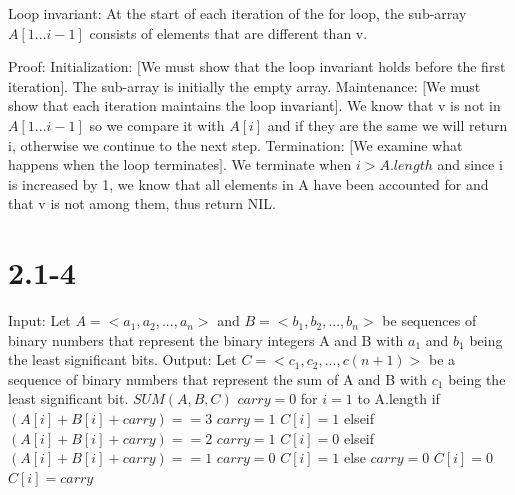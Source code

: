 \documentclass[12pt]{article}
\newcommand\tab[1][1cm]{\hspace*{#1}}
\begin{document}
Loop invariant: At the start of each iteration of the for loop, the sub-array $A[1...i-1]$ consists of elements that are different than v. \newline

Proof: \newline 
Initialization: $[$We must show that the loop invariant holds before the first iteration$]$. The sub-array is initially the empty array. \newline  \newline 
Maintenance: $[$We must show that each iteration maintains the loop invariant$]$. We know that v is not in $A[1...i-1]$ so we compare it with $A[i]$ and if they are the same we will return i, otherwise we continue to the next step. \newline \newline
Termination: $[$We examine what happens when the loop terminates$]$. We terminate when $i>A.length$ and since i is increased by 1, we know that all elements in A have been accounted for and that v is not among them, thus return NIL.

\section{2.1-4}
Input: Let $A=<a_1,a_2,...,a_n>$ and $B=<b_1,b_2,...,b_n>$ be sequences of binary numbers that represent the binary integers A and B with $a_1$ and $b_1$ being the least significant bits. \newline  \newline
Output: Let $C=<c_1,c_2,...,c(n+1)>$ be a sequence of binary numbers that represent the sum of A and B with $c_1$ being the least significant bit. \newline  \newline
$SUM(A,B,C)$ \newline
\tab $carry=0$ \newline
\tab for $i=1$ to A.length \newline
\tab \tab if $(A[i]+B[i]+carry)==3$ \newline
\tab \tab \tab $carry=1$ \newline
\tab \tab \tab $C[i]=1$ \newline
\tab \tab elseif $(A[i]+B[i]+carry)==2$ \newline
\tab \tab \tab $carry=1$ \newline
\tab \tab \tab $C[i]=0$ \newline
\tab \tab elseif $(A[i]+B[i]+carry)==1$ \newline
\tab \tab \tab $carry=0$ \newline
\tab \tab \tab $C[i]=1$ \newline
\tab \tab else \newline
\tab \tab \tab $carry=0$ \newline
\tab \tab \tab $C[i]=0$ \newline
$C[i]=carry$
\end{document}
